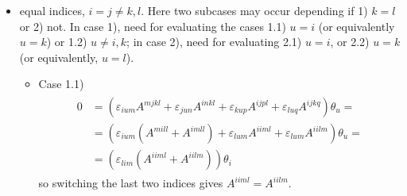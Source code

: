 \documentclass[letterpaper,10pt,english]{jupyterBook}
\begin{document}
\begin{itemize}
\item {} 
 equal indices, \(i = j \ne k, l\). Here two sub\sphinxhyphen{}cases may occur depending if 1) \(k = l\) or 2) not. In case 1), need for evaluating the cases 1.1) \(u = i\) (or equivalently \(u=k\)) or 1.2) \(u \ne i,k\); in case 2), need for evaluating 2.1) \(u = i\), or 2.2) \(u = k\) (or equivalently, \(u = l\)).
\begin{itemize}
\item {} 
\sphinxAtStartPar
Case 1.1)
\begin{equation*}
\begin{split}\begin{aligned}
       0 
       & = \left( \varepsilon_{ium} A^{mjkl} + \varepsilon_{jun} A^{inkl} + \varepsilon_{kup} A^{ijpl} + \varepsilon_{luq} A^{ijkq} \right) \theta_u = \\
       & = \left( \varepsilon_{ium} ( A^{mill} + A^{imll} ) + \varepsilon_{lum} A^{iiml} + \varepsilon_{lum} A^{iilm} \right) \theta_u = \\
       & =                                           \left(  \varepsilon_{lim} ( A^{iiml} + A^{iilm} ) \right) \theta_i
     \end{aligned}\end{split}
\end{equation*}
\sphinxAtStartPar
so switching the last two indices gives \(A^{iiml} = A^{iilm}\).


\end{itemize}
\end{itemize}
\end{document}

